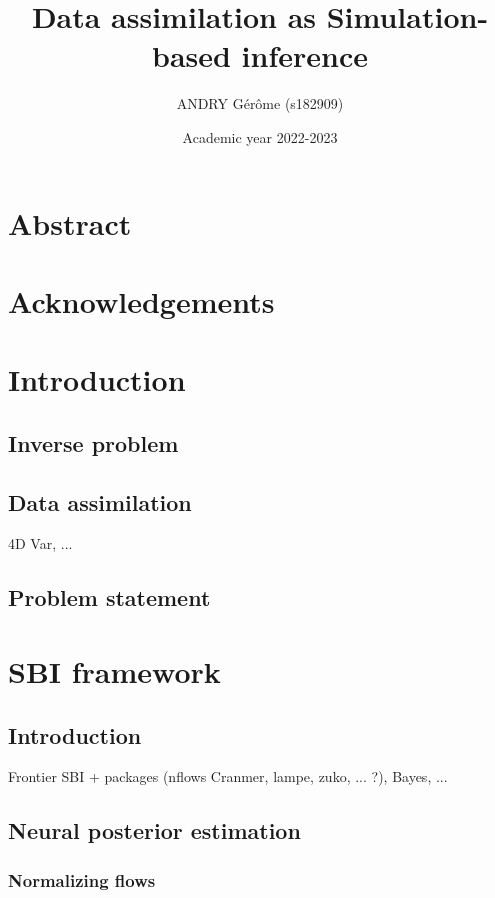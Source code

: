 \documentclass[a4paper, 12pt]{article}
\title{Data assimilation as Simulation-based inference}
\author{ANDRY Gérôme (s182909)}
\date{Academic year 2022-2023}
\begin{document}
\maketitle

\newpage
\section*{Abstract}


\newpage
\section*{Acknowledgements}

\newpage
\tableofcontents
\newpage


\section{Introduction}
\subsection{Inverse problem}

\subsection{Data assimilation}
4D Var, ... 
\subsection{Problem statement}

\section{SBI framework}
\subsection{Introduction}
Frontier SBI + packages (nflows Cranmer, lampe, zuko, ... ?), Bayes, ...
\subsection{Neural posterior estimation}
\subsubsection{Normalizing flows}
\end{document}
